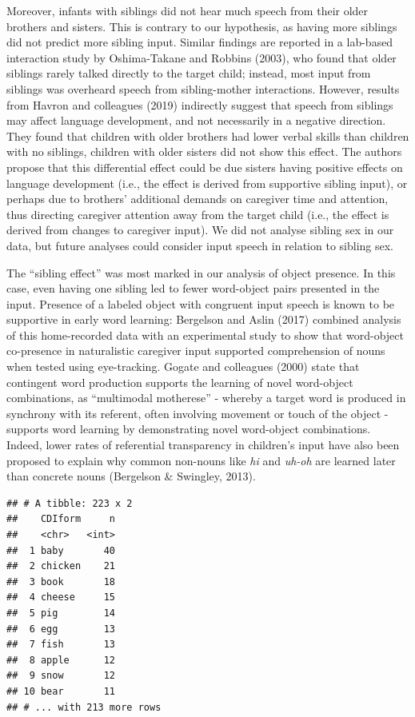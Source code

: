 \documentclass[
  english,
  man,floatsintext]{apa6}
\begin{document}
Moreover, infants with siblings did not hear much speech from their older brothers and sisters. This is contrary to our hypothesis, as having more siblings did not predict more sibling input. Similar findings are reported in a lab-based interaction study by Oshima-Takane and Robbins (2003), who found that older siblings rarely talked directly to the target child; instead, most input from siblings was overheard speech from sibling-mother interactions. However, results from Havron and colleagues (2019) indirectly suggest that speech from siblings may affect language development, and not necessarily in a negative direction. They found that children with older brothers had lower verbal skills than children with no siblings, children with older sisters did not show this effect. The authors propose that this differential effect could be due sisters having positive effects on language development (i.e., the effect is derived from supportive sibling input), or perhaps due to brothers' additional demands on caregiver time and attention, thus directing caregiver attention away from the target child (i.e., the effect is derived from changes to caregiver input). We did not analyse sibling sex in our data, but future analyses could consider input speech in relation to sibling sex.

The \enquote{sibling effect} was most marked in our analysis of object presence. In this case, even having one sibling led to fewer word-object pairs presented in the input. Presence of a labeled object with congruent input speech is known to be supportive in early word learning: Bergelson and Aslin (2017) combined analysis of this home-recorded data with an experimental study to show that word-object co-presence in naturalistic caregiver input supported comprehension of nouns when tested using eye-tracking. Gogate and colleagues (2000) state that contingent word production supports the learning of novel word-object combinations, as \enquote{multimodal motherese} - whereby a target word is produced in synchrony with its referent, often involving movement or touch of the object - supports word learning by demonstrating novel word-object combinations. Indeed, lower rates of referential transparency in children's input have also been proposed to explain why common non-nouns like \emph{hi} and \emph{uh-oh} are learned later than concrete nouns (Bergelson \& Swingley, 2013).

\begin{verbatim}
## # A tibble: 223 x 2
##    CDIform     n
##    <chr>   <int>
##  1 baby       40
##  2 chicken    21
##  3 book       18
##  4 cheese     15
##  5 pig        14
##  6 egg        13
##  7 fish       13
##  8 apple      12
##  9 snow       12
## 10 bear       11
## # ... with 213 more rows
\end{verbatim}
\end{document}
